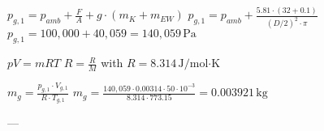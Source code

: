 \( p_{g,1} = p_{amb} + \frac{F}{A} + g \cdot (m_K + m_{EW}) \)  
\( p_{g,1} = p_{amb} + \frac{5.81 \cdot (32 + 0.1)}{(D/2)^2 \cdot \pi} \)  
\( p_{g,1} = 100,000 + 40,059 = 140,059 \, \text{Pa} \)  

\( pV = mRT \)  
\( R = \frac{R}{M} \) with \( R = 8.314 \, \text{J/mol·K} \)  

\( m_g = \frac{p_{g,1} \cdot V_{g,1}}{R \cdot T_{g,1}} \)  
\( m_g = \frac{140,059 \cdot 0.00314 \cdot 50 \cdot 10^{-3}}{8.314 \cdot 773.15} = 0.003921 \, \text{kg} \)  

---